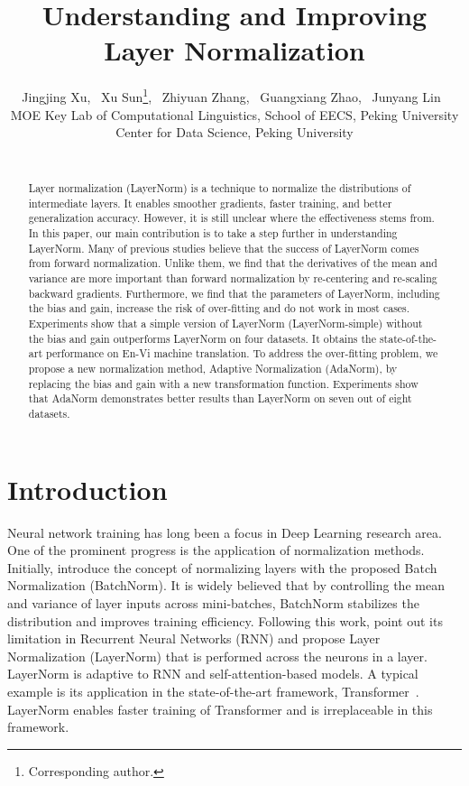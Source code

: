 \documentclass{article}
\title{Understanding and Improving Layer Normalization}
\author{
Jingjing Xu\affmark[1], \ 
Xu Sun\affmark[1,2]\thanks{Corresponding author.}, \ 
Zhiyuan Zhang\affmark[1], \ 
Guangxiang Zhao\affmark[2], \
Junyang Lin\affmark[1] \
\\ 
\affmark[1] MOE Key Lab of Computational Linguistics, School of EECS, Peking University  \\
\affmark[2] Center for Data Science, Peking University \\
\footnotesize \email{\{jingjingxu,xusun,zzy1210,zhaoguangxiang,linjunyang\}@pku.edu.cn }\\
}
\date{}
\begin{document}
\maketitle


\begin{abstract}

Layer normalization (LayerNorm) is a technique to normalize the distributions of intermediate layers.
It enables smoother gradients, faster training, and better generalization accuracy. 
However, it is still unclear where the effectiveness stems from.
In this paper, our main contribution is to take a step further in understanding LayerNorm.  Many of previous studies believe that the success of LayerNorm comes from  forward normalization. Unlike them, we find that the derivatives of the mean and variance are more important than forward normalization by re-centering and re-scaling backward gradients. Furthermore, we find that the parameters of LayerNorm, including the bias and gain, increase the risk of over-fitting and do not work in most cases. Experiments show that a simple version  of LayerNorm (LayerNorm-simple) without the bias and gain outperforms LayerNorm on four datasets. It obtains the state-of-the-art performance on En-Vi machine translation. 
To address the over-fitting problem, we propose a new normalization method, Adaptive Normalization (AdaNorm), by replacing the bias and gain with a new transformation function. Experiments show that AdaNorm demonstrates better results than LayerNorm  on seven out of eight datasets. 






\end{abstract}

\section{Introduction}





Neural network training has long been a focus in Deep Learning research area. 
One of the prominent progress is the application of normalization methods. 
Initially, \citet{ioffe2015batch} introduce the concept of normalizing layers with the proposed Batch Normalization (BatchNorm). It is widely believed that by controlling the mean and variance of layer inputs across mini-batches, BatchNorm stabilizes the distribution and improves training efficiency. 
Following this work, \citet{lei2016layer} point out its limitation in Recurrent Neural Networks (RNN) and propose Layer Normalization (LayerNorm) that is performed across the neurons in a layer.
LayerNorm is adaptive to RNN and self-attention-based models. 
A typical example is its application in the state-of-the-art framework, Transformer~\citep{DBLP:conf/nips/VaswaniSPUJGKP17}.
LayerNorm enables faster training of Transformer and is irreplaceable in this framework. 
\end{document}
